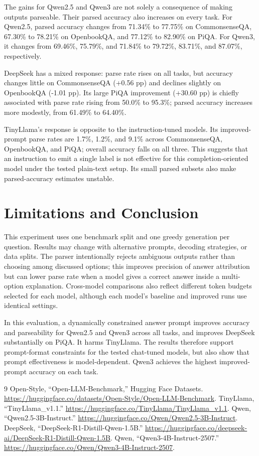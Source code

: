 \documentclass[10pt,twocolumn]{article}
\begin{document}
The gains for Qwen2.5 and Qwen3 are not solely a consequence of making outputs parseable. Their parsed accuracy also increases on every task. For Qwen2.5, parsed accuracy changes from 71.34\% to 77.75\% on CommonsenseQA, 67.30\% to 78.21\% on OpenbookQA, and 77.12\% to 82.90\% on PiQA. For Qwen3, it changes from 69.46\%, 75.79\%, and 71.84\% to 79.72\%, 83.71\%, and 87.07\%, respectively.

DeepSeek has a mixed response: parse rate rises on all tasks, but accuracy changes little on CommonsenseQA (+0.56 pp) and declines slightly on OpenbookQA (-1.01 pp). Its large PiQA improvement (+30.60 pp) is chiefly associated with parse rate rising from 50.0\% to 95.3\%; parsed accuracy increases more modestly, from 61.49\% to 64.40\%.

TinyLlama's response is opposite to the instruction-tuned models. Its improved-prompt parse rates are 1.7\%, 1.2\%, and 9.1\% across CommonsenseQA, OpenbookQA, and PiQA; overall accuracy falls on all three. This suggests that an instruction to emit a single label is not effective for this completion-oriented model under the tested plain-text setup. Its small parsed subsets also make parsed-accuracy estimates unstable.

\section{Limitations and Conclusion}
This experiment uses one benchmark split and one greedy generation per question. Results may change with alternative prompts, decoding strategies, or data splits. The parser intentionally rejects ambiguous outputs rather than choosing among discussed options; this improves precision of answer attribution but can lower parse rate when a model gives a correct answer inside a multi-option explanation. Cross-model comparisons also reflect different token budgets selected for each model, although each model's baseline and improved runs use identical settings.

In this evaluation, a dynamically constrained answer prompt improves accuracy and parseability for Qwen2.5 and Qwen3 across all tasks, and improves DeepSeek substantially on PiQA. It harms TinyLlama. The results therefore support prompt-format constraints for the tested chat-tuned models, but also show that prompt effectiveness is model-dependent. Qwen3 achieves the highest improved-prompt accuracy on each task.

\begin{thebibliography}{9}
 Open-Style, ``Open-LLM-Benchmark,'' Hugging Face Datasets. \url{https://huggingface.co/datasets/Open-Style/Open-LLM-Benchmark}.
 TinyLlama, ``TinyLlama_v1.1.'' \url{https://huggingface.co/TinyLlama/TinyLlama_v1.1}.
 Qwen, ``Qwen2.5-3B-Instruct.'' \url{https://huggingface.co/Qwen/Qwen2.5-3B-Instruct}.
 DeepSeek, ``DeepSeek-R1-Distill-Qwen-1.5B.'' \url{https://huggingface.co/deepseek-ai/DeepSeek-R1-Distill-Qwen-1.5B}.
 Qwen, ``Qwen3-4B-Instruct-2507.'' \url{https://huggingface.co/Qwen/Qwen3-4B-Instruct-2507}.
\end{thebibliography}
\end{document}
